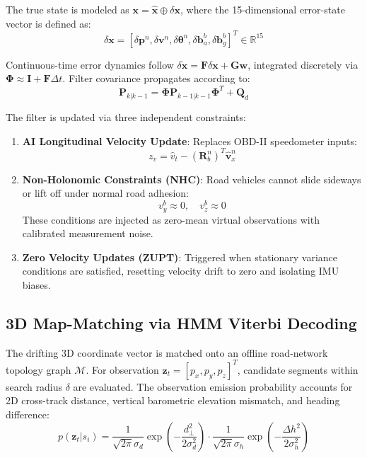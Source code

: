 The true state is modeled as $\mathbf{x} = \hat{\mathbf{x}} \oplus \delta\mathbf{x}$, where the 15-dimensional error-state vector is defined as:
\begin{equation}
\delta\mathbf{x} = \left[\delta\mathbf{p}^n, \delta\mathbf{v}^n, \delta\boldsymbol{\theta}^n, \delta\mathbf{b}_a^b, \delta\mathbf{b}_g^b\right]^T \in \mathbb{R}^{15}
\end{equation}

Continuous-time error dynamics follow $\delta\dot{\mathbf{x}} = \mathbf{F}\delta\mathbf{x} + \mathbf{G}\mathbf{w}$, integrated discretely via $\boldsymbol{\Phi} \approx \mathbf{I} + \mathbf{F}\Delta t$. Filter covariance propagates according to:
\begin{equation}
\mathbf{P}_{k|k-1} = \boldsymbol{\Phi}\mathbf{P}_{k-1|k-1}\boldsymbol{\Phi}^T + \mathbf{Q}_d
\end{equation}

The filter is updated via three independent constraints:
\begin{enumerate}
\item \textbf{AI Longitudinal Velocity Update}: Replaces OBD-II speedometer inputs:
\begin{equation}
z_v = \hat{v}_t - (\mathbf{R}_b^n)^T \hat{\mathbf{v}}_x^n
\end{equation}
\item \textbf{Non-Holonomic Constraints (NHC)}: Road vehicles cannot slide sideways or lift off under normal road adhesion:
\begin{equation}
v_y^b \approx 0, \quad v_z^b \approx 0
\end{equation}
These conditions are injected as zero-mean virtual observations with calibrated measurement noise.
\item \textbf{Zero Velocity Updates (ZUPT)}: Triggered when stationary variance conditions are satisfied, resetting velocity drift to zero and isolating IMU biases.
\end{enumerate}

\subsection{3D Map-Matching via HMM Viterbi Decoding}

The drifting 3D coordinate vector is matched onto an offline road-network topology graph $\mathcal{M}$. For observation $\mathbf{z}_t = [p_x, p_y, p_z]^T$, candidate segments within search radius $\delta$ are evaluated. The observation emission probability accounts for 2D cross-track distance, vertical barometric elevation mismatch, and heading difference:
\begin{equation}
p(\mathbf{z}_t|s_i) = \frac{1}{\sqrt{2\pi}\sigma_d}\exp\left(-\frac{d_{\perp}^2}{2\sigma_d^2}\right) \cdot \frac{1}{\sqrt{2\pi}\sigma_h}\exp\left(-\frac{\Delta h^2}{2\sigma_h^2}\right)
\end{equation}

